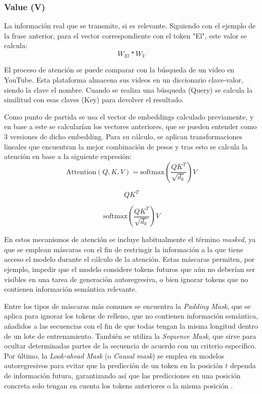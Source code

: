 \documentclass[11pt]{book}
\begin{document}
\subsubsection{Value (V)}
La información real que se transmite, si es relevante. Siguiendo con el ejemplo de la frase anterior, para el vector correspondiente con el token "El", este valor se calcula: \[W_{El} * W_{V}\]

El proceso de atención se puede comparar con la búsqueda de un video en YouTube. Esta plataforma almacena sus videos en un diccionario clave-valor, siendo la clave el nombre. Cuando se realiza una búsqueda (Query) se calcula la similitud con esas claves (Key) para devolver el resultado.

Como punto de partida se usa el vector de embeddings calculado previamente, y en base a este se calcularían los vectores anteriores, que se pueden entender como 3 versiones de dicho embedding. Para su cálculo, se aplican transformaciones lineales que encuentran la mejor combinación de pesos y tras esto se calcula la atención en base a la siguiente expresión:
\[
\text{Attention}(Q, K, V) = \text{softmax}\!\left(\frac{QK^{T}}{\sqrt{d_k}}\right)V
\]

\[
QK^{T}
\]
\noindent{}

\[
\mathrm{softmax}\!\left(\frac{QK^{T}}{\sqrt{d_k}}\right)V
\]
\noindent{}

En estos mecanismos de atención se incluye habitualmente el término \textit{masked}, ya que se emplean máscaras con el fin de restringir la información a la que tiene acceso el modelo durante el cálculo de la atención. Estas máscaras permiten, por ejemplo, impedir que el modelo considere tokens futuros que aún no deberían ser visibles en una tarea de generación autoregresiva, o bien ignorar tokens que no contienen información semántica relevante. 

Entre los tipos de máscaras más comunes se encuentra la \textit{Padding Mask}, que se aplica para ignorar los tokens de relleno, que no contienen información semántica, añadidos a las secuencias con el fin de que todas tengan la misma longitud dentro de un lote de entrenamiento. También se utiliza la \textit{Sequence Mask}, que sirve para ocultar determinadas partes de la secuencia de acuerdo con un criterio específico. Por último, la \textit{Look-ahead Mask} (o \textit{Causal mask}) se emplea en modelos autoregresivos para evitar que la predicción de un token en la posición $t$ dependa de información futura, garantizando así que las predicciones en una posición concreta solo tengan en cuenta los tokens anteriores o la misma posición \parencite{swarms_masking_pytorch}.
\end{document}
